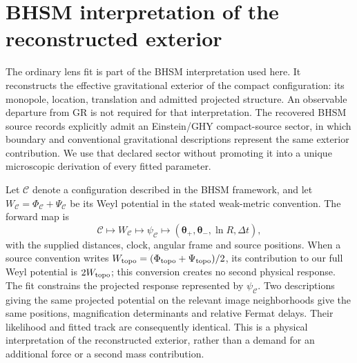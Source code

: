 \section{BHSM interpretation of the reconstructed exterior}
\label{sec:bhsm-interpretation}

The ordinary lens fit is part of the BHSM interpretation used here.
It reconstructs the effective gravitational exterior of the compact
configuration: its monopole, location, translation and admitted projected
structure. An observable departure from GR is not required for that
interpretation. The recovered BHSM source records explicitly admit an
Einstein/GHY compact-source sector, in which boundary and conventional
gravitational descriptions represent the same exterior contribution.
We use that declared sector without promoting it into a unique
microscopic derivation of every fitted parameter.

Let $\mathcal C$ denote a configuration described in the BHSM framework,
and let $W_{\mathcal C}=\Phi_{\mathcal C}+\Psi_{\mathcal C}$ be its
Weyl potential in the stated weak-metric convention. The forward map is
\begin{equation}
 \mathcal C\longmapsto W_{\mathcal C}
 \longmapsto\psi_{\mathcal C}
 \longmapsto(\boldsymbol\theta_+,\boldsymbol\theta_-,
                  \ln R,\Delta t),
 \label{eq:bhsm-optical-interpretation}
\end{equation}
with the supplied distances, clock, angular frame and source positions.
When a source convention writes
$W_{\rm topo}=(\Phi_{\rm topo}+\Psi_{\rm topo})/2$, its contribution to
our full Weyl potential is $2W_{\rm topo}$; this conversion creates no
second physical response.
The fit constrains the projected response represented by
$\psi_{\mathcal C}$. Two descriptions giving the same projected potential
on the relevant image neighborhoods give the same positions,
magnification determinants and relative Fermat delays. Their likelihood
and fitted track are consequently identical. This is a physical
interpretation of the reconstructed exterior, rather than a demand for
an additional force or a second mass contribution.

